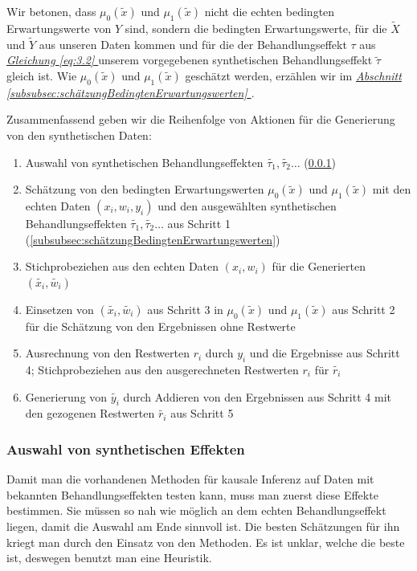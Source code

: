 \documentclass[12pt,a4paper,twoside]{scrartcl}
\numberwithin{equation}{section}
\newcommand{\refsec}[1]{\emph{\hyperref[#1]{Abschnitt \ref*{#1} }}}
\renewcommand*{\refeq}[1]{\emph{\hyperref[#1]{Gleichung \ref*{#1} }}}
\begin{document}
\noindent
Wir betonen, dass $\mu_0(\tilde{x})$ und $\mu_1(\tilde{x})$ nicht die echten bedingten Erwartungswerte von $Y$ sind, sondern die bedingten Erwartungswerte, für die $\widetilde{X}$ und $\widetilde{Y}$ aus unseren Daten kommen und für die der Behandlungseffekt $\tau$ aus \refeq{eq:3.2} unserem vorgegebenen synthetischen Behandlungseffekt $\tilde{\tau}$ gleich ist. Wie $\mu_0(\tilde{x})$ und $\mu_1(\tilde{x})$ geschätzt werden, erzählen wir im \refsec{subsubsec:schätzungBedingtenErwartungswerten}.\par 

\noindent
Zusammenfassend geben wir die Reihenfolge von Aktionen für die Generierung von den synthetischen Daten:\par

\begin{enumerate}

\item Auswahl von synthetischen Behandlungseffekten $\tilde{\tau_1},\tilde{\tau_2}\dots$ (\ref{subsubsec:auswahlSynthEffekten}) 

\item Schätzung von den bedingten Erwartungswerten $\mu_0(\tilde{x})$ und $\mu_1(\tilde{x})$ mit den echten Daten $(x_i,w_i,y_i)$ und den ausgewählten synthetischen Behandlungseffekten $\tilde{\tau_1},\tilde{\tau_2}\dots$ aus Schritt 1  (\ref{subsubsec:schätzungBedingtenErwartungswerten})

\item Stichprobeziehen aus den echten Daten $(x_i,w_i)$ für die Generierten $(\tilde{x_i},\tilde{w_i})$ 

\item Einsetzen von $(\tilde{x_i},\tilde{w_i})$ aus Schritt 3 in $\mu_0(\tilde{x})$ und $\mu_1(\tilde{x})$ aus Schritt 2 für die Schätzung von den Ergebnissen ohne Restwerte

\item Ausrechnung von den Restwerten $r_i$ durch $y_i$ und die Ergebnisse aus Schritt 4; Stichprobeziehen aus den ausgerechneten Restwerten $r_i$ für $\tilde{r_i}$

\item Generierung von $\tilde{y_i}$ durch Addieren von den Ergebnissen aus Schritt 4 mit den gezogenen Restwerten $\tilde{r_i}$ aus Schritt 5

\end{enumerate}
  		\subsubsection{Auswahl von synthetischen Effekten}\label{subsubsec:auswahlSynthEffekten}
  		Damit man die vorhandenen Methoden für kausale Inferenz auf Daten mit bekannten Behandlungseffekten testen kann, muss man zuerst diese Effekte bestimmen. Sie müssen so nah wie möglich an dem echten Behandlungseffekt liegen, damit die Auswahl am Ende sinnvoll ist. Die besten Schätzungen für ihn kriegt man durch den Einsatz von den Methoden. Es ist unklar, welche die beste ist, deswegen benutzt man eine Heuristik\cite{schuler2017synth}.\par 
  		
\end{document}
